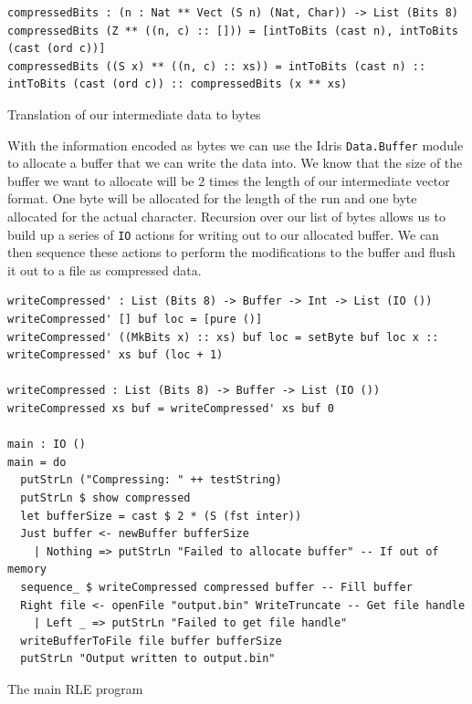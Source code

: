 \documentclass[a4paper, notitlepage]{report}
\begin{document}
\begin{listing}[H]
\begin{verbatim}
compressedBits : (n : Nat ** Vect (S n) (Nat, Char)) -> List (Bits 8)
compressedBits (Z ** ((n, c) :: [])) = [intToBits (cast n), intToBits (cast (ord c))]
compressedBits ((S x) ** ((n, c) :: xs)) = intToBits (cast n) :: intToBits (cast (ord c)) :: compressedBits (x ** xs)
\end{verbatim}
\caption{Translation of our intermediate data to bytes}
\end{listing}

With the information encoded as bytes we can use the Idris \texttt{Data.Buffer} module to
allocate a buffer that we can write the data into. We know that the size of the
buffer we want to allocate will be 2 times the length of our intermediate vector
format. One byte will be allocated for the length of the run and one byte
allocated for the actual character. Recursion over our list of bytes allows us
to build up a series of \texttt{IO} actions for writing out to our allocated buffer. We
can then sequence these actions to perform the modifications to the buffer and
flush it out to a file as compressed data.

\begin{listing}[H]
\begin{verbatim}
writeCompressed' : List (Bits 8) -> Buffer -> Int -> List (IO ())
writeCompressed' [] buf loc = [pure ()]
writeCompressed' ((MkBits x) :: xs) buf loc = setByte buf loc x :: writeCompressed' xs buf (loc + 1)

writeCompressed : List (Bits 8) -> Buffer -> List (IO ())
writeCompressed xs buf = writeCompressed' xs buf 0

main : IO ()
main = do
  putStrLn ("Compressing: " ++ testString)
  putStrLn $ show compressed
  let bufferSize = cast $ 2 * (S (fst inter))
  Just buffer <- newBuffer bufferSize
    | Nothing => putStrLn "Failed to allocate buffer" -- If out of memory
  sequence_ $ writeCompressed compressed buffer -- Fill buffer
  Right file <- openFile "output.bin" WriteTruncate -- Get file handle
    | Left _ => putStrLn "Failed to get file handle"
  writeBufferToFile file buffer bufferSize
  putStrLn "Output written to output.bin"
\end{verbatim}
\caption{The main RLE program}
\end{listing}
\end{document}
